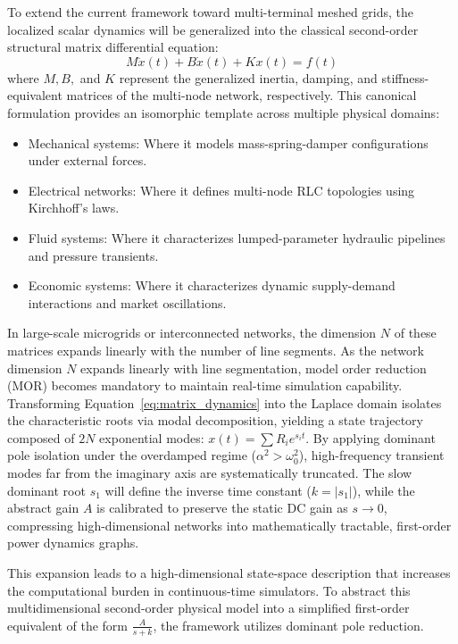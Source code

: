 \documentclass[energies,accept,oneauthor,pdftex]{Definitions/mdpi}
\begin{document}
To extend the current framework toward multi-terminal meshed grids, the localized scalar dynamics will be generalized into the classical second-order structural matrix differential equation:
\begin{equation}
    M \ddot{x}(t) + B \dot{x}(t) + K x(t) = f(t)
    \label{eq:matrix_dynamics}
\end{equation}
where $M, B,$ and $K$ represent the generalized inertia, damping, and stiffness-equivalent matrices of the multi-node network, respectively. This canonical formulation provides an isomorphic template across multiple physical domains:
\begin{itemize}
    \item {Mechanical systems:} Where it models mass-spring-damper configurations under external forces.
    \item {Electrical networks:} Where it defines multi-node RLC topologies using Kirchhoff's laws.
    \item {Fluid systems:} Where it characterizes lumped-parameter hydraulic pipelines and pressure transients.
    \item {Economic systems:} Where it characterizes dynamic supply-demand interactions and market oscillations.
\end{itemize}

In large-scale microgrids or interconnected networks, the dimension $N$ of these matrices expands linearly with the number of line segments. As the network dimension $N$ expands linearly with line segmentation, model order reduction (MOR) becomes mandatory to maintain real-time simulation capability. Transforming Equation~\ref{eq:matrix_dynamics} into the Laplace domain isolates the characteristic roots via modal decomposition, yielding a state trajectory composed of $2N$ exponential modes: $x(t) = \sum R_i e^{s_i t}$. By applying dominant pole isolation under the overdamped regime ($\alpha^2 > \omega_0^2$), high-frequency transient modes far from the imaginary axis are systematically truncated. The slow dominant root $s_1$ will define the inverse time constant ($k = |s_1|$), while the abstract gain $A$ is calibrated to preserve the static DC gain as $s \to 0$, compressing high-dimensional networks into mathematically tractable, first-order power dynamics graphs.




This expansion leads to a high-dimensional state-space description that increases the computational burden in continuous-time simulators. To abstract this multidimensional second-order physical model into a simplified first-order equivalent of the form $\frac{A}{s+k}$, the framework utilizes dominant pole reduction.
\end{document}
